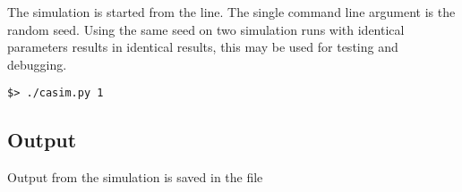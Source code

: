 \documentclass[11pt,a4paper]{article}
\begin{document}
The simulation is started from the line. The single command line argument is the
random seed. Using the same seed on two simulation runs with identical
parameters results in identical results, this may be used for testing and
debugging.
\begin{verbatim}
$> ./casim.py 1
\end{verbatim}

\subsection{Output}
Output from the simulation is saved in the file





%
%

\end{document}

